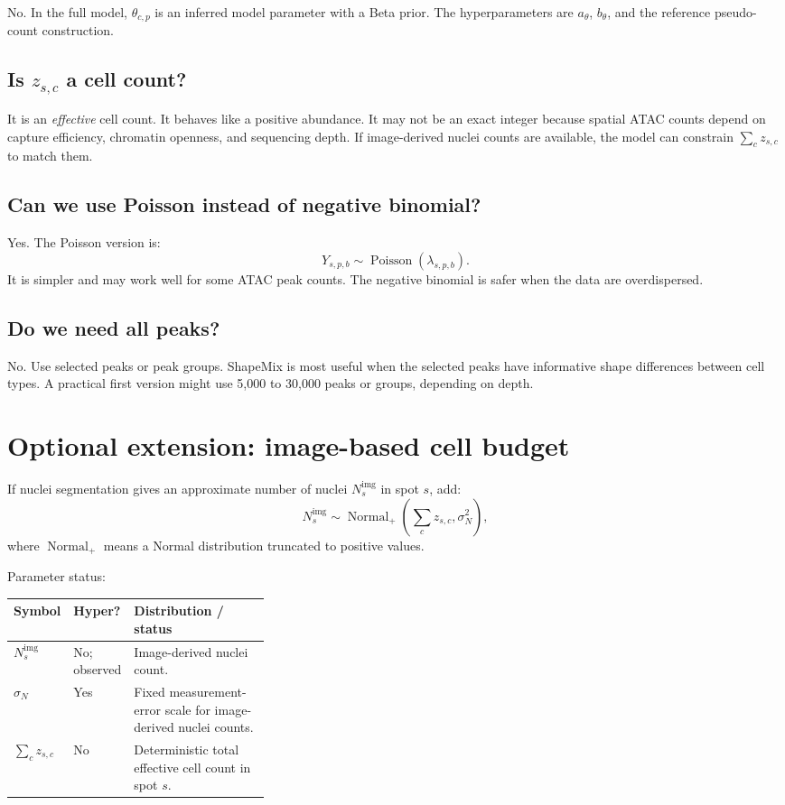 \documentclass[11pt]{article}
\newcommand{\Pois}{\operatorname{Poisson}}
\newcommand{\Normal}{\operatorname{Normal}}
\begin{document}
No.  In the full model, \(\theta_{c,p}\) is an inferred model parameter with a Beta prior.  The hyperparameters are \(a_\theta\), \(b_\theta\), and the reference pseudo-count construction.

\subsection{Is \texorpdfstring{\(z_{s,c}\)}{z} a cell count?}

It is an \emph{effective} cell count.  It behaves like a positive abundance.  It may not be an exact integer because spatial ATAC counts depend on capture efficiency, chromatin openness, and sequencing depth.  If image-derived nuclei counts are available, the model can constrain \(\sum_c z_{s,c}\) to match them.

\subsection{Can we use Poisson instead of negative binomial?}

Yes.  The Poisson version is:
\[
Y_{s,p,b}\sim\Pois(\lambda_{s,p,b}).
\]
It is simpler and may work well for some ATAC peak counts.  The negative binomial is safer when the data are overdispersed.

\subsection{Do we need all peaks?}

No.  Use selected peaks or peak groups.  ShapeMix is most useful when the selected peaks have informative shape differences between cell types.  A practical first version might use 5,000 to 30,000 peaks or groups, depending on depth.

\section{Optional extension: image-based cell budget}

If nuclei segmentation gives an approximate number of nuclei \(N_s^{\mathrm{img}}\) in spot \(s\), add:
\[
N_s^{\mathrm{img}} \sim \Normal_+\left(\sum_c z_{s,c},\sigma_N^2\right),
\]
where \(\Normal_+\) means a Normal distribution truncated to positive values.

Parameter status:

\begin{center}
\begin{tabularx}{\linewidth}{L{0.18\linewidth}C{0.15\linewidth}X}
\toprule
Symbol & Hyper? & Distribution / status \\
\midrule
\(N_s^{\mathrm{img}}\) & No; observed & Image-derived nuclei count. \\
\(\sigma_N\) & Yes & Fixed measurement-error scale for image-derived nuclei counts. \\
\(\sum_c z_{s,c}\) & No & Deterministic total effective cell count in spot \(s\). \\
\bottomrule
\end{tabularx}
\end{center}
\end{document}
